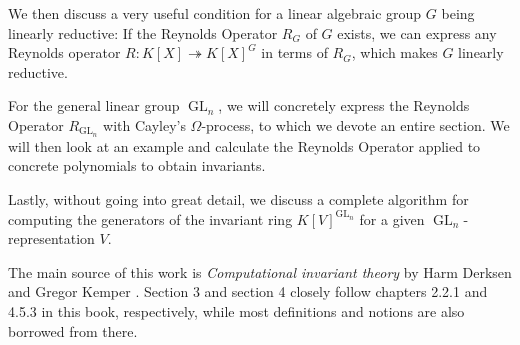 We then discuss a very useful condition for a linear algebraic group $G$ being linearly reductive:  If the Reynolds Operator $R_G$ of $G$ exists, we can express any Reynolds operator $R\colon K[X] \twoheadrightarrow K[X]^G$ in terms of $R_G$, which makes $G$ linearly reductive.

For the general linear group $\operatorname{GL}_n$, we will concretely express the Reynolds Operator $R_{\operatorname{GL}_n}$ with Cayley's $\Omega$-process, to which we devote an entire section.
We will then look at an example and calculate the Reynolds Operator applied to concrete polynomials to obtain invariants.

Lastly, without going into great detail, we discuss a complete algorithm for computing the generators of the invariant ring $K[V]^{\operatorname{GL}_n}$ for a given $\operatorname{GL}_n$-representation $V$.
\vspace{0.5cm}

The main source of this work is \textit{Computational invariant theory} by Harm Derksen and Gregor Kemper \cite{DK15}.
Section 3 and section 4 closely follow chapters 2.2.1 and 4.5.3 in this book, respectively, while most definitions and notions are also borrowed from there.

